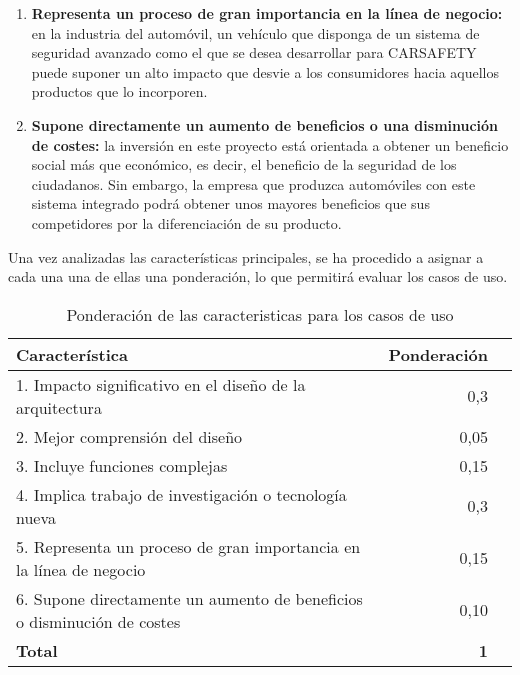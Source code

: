\begin{enumerate}
\item \textbf{Representa un proceso de gran importancia en la línea de negocio:} en la industria del automóvil, un vehículo que disponga de un sistema de seguridad avanzado como el que se desea desarrollar para CARSAFETY puede suponer un alto impacto que desvie a los consumidores hacia aquellos productos que lo incorporen.

\item \textbf{Supone directamente un aumento de beneficios o una disminución de costes:} la inversión en este proyecto está orientada a obtener un beneficio social más que económico, es decir, el beneficio de la seguridad de los ciudadanos. Sin embargo, la empresa que produzca automóviles con este sistema integrado podrá obtener unos mayores beneficios que sus competidores por la diferenciación de su producto.
\end{enumerate}

\par Una vez analizadas las características principales, se ha procedido a asignar a cada una una de ellas una ponderación, lo que permitirá evaluar los casos de uso.

\begin{table}[H]
\begin{center}
\begin{tabular}{p{11cm} r p{}}
\textbf{Característica} & \textbf{Ponderación} \\ \hline \hline
1. Impacto significativo en el diseño de la arquitectura & 0,3 \\ \hline
2. Mejor comprensión del diseño & 0,05 \\ \hline
3. Incluye funciones complejas & 0,15 \\ \hline
4. Implica trabajo de investigación o tecnología nueva &  0,3 \\ \hline
5. Representa un proceso de gran importancia en la línea de negocio & 0,15 \\ \hline
6. Supone directamente un aumento de beneficios o disminución de costes & 0,10 \\ \hline \hline
\textbf{Total} & \textbf{1} \\
\end{tabular}
\caption{Ponderación de las caracteristicas para los casos de uso}
\label{tab:priorizacion}
\end{center}
\end{table}
